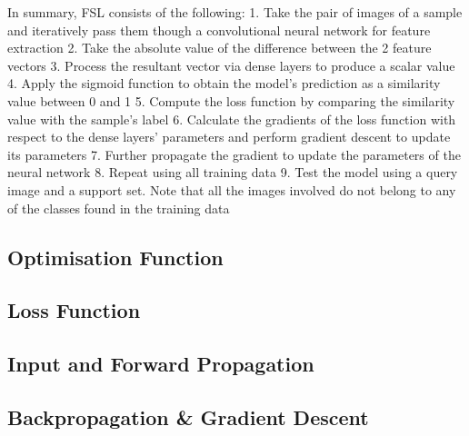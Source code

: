\documentclass[12pt, letterpaper]{article}
\begin{document}
    In summary, FSL consists of the following:
    1. Take the pair of images of a sample and iteratively pass them though a convolutional neural network for feature extraction
    2. Take the absolute value of the difference between the 2 feature vectors
    3. Process the resultant vector via dense layers to produce a scalar value
    4. Apply the sigmoid function to obtain the model's prediction as a similarity value between 0 and 1
    5. Compute the loss function by comparing the similarity value with the sample's label 
    6. Calculate the gradients of the loss function with respect to the dense layers' parameters and perform gradient descent to update its parameters 
    7. Further propagate the gradient to update the parameters of the neural network
    8. Repeat using all training data
    9. Test the model using a query image and a support set. Note that all the images involved do not belong to any of the classes found in the training data

\subsection{Optimisation Function}


\subsection{Loss Function}


\subsection{Input and Forward Propagation}


\subsection{Backpropagation \& Gradient Descent}
\end{document}
